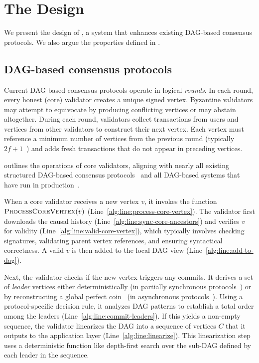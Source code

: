 \section{The \sysname Design} \label{sec:design}

We present the design of \sysname, a system that enhances existing DAG-based consensus protocols. We also argue the properties defined in .

\subsection{DAG-based consensus protocols} \label{sec:dag}

Current DAG-based consensus protocols operate in logical \emph{rounds}. In each round, every honest (core) validator creates a unique signed vertex. Byzantine validators may attempt to equivocate by producing conflicting vertices or may abstain altogether. During each round, validators collect transactions from users and vertices from other validators to construct their next vertex. Each vertex must reference a minimum number of vertices from the previous round (typically $2f + 1$~\cite{narwhal,bullshark,mysticeti}) and adds fresh transactions that do not appear in preceding vertices.

 outlines the operations of core validators, aligning with nearly all existing structured DAG-based consensus protocols~\cite{narwhal,bullshark,shoal,shoal++,mysticeti,dag-rider,dumbo-ng,dispersedledger,sailfish,bbca-chain,fino,gradeddag,cordial-miners,wahoo,lightdag,dai2024remora} and all DAG-based systems that have run in production~\cite{narwhal,bullshark,mysticeti,hammerhead}.

When a core validator receives a new vertex $v$, it invokes the function $\Call{ProcessCoreVertex}{v}$ (Line~\ref{alg:line:process-core-vertex}). The validator first downloads the causal history (Line~\ref{alg:line:sync-core-ancestors}) and verifies $v$ for validity (Line~\ref{alg:line:valid-core-vertex}), which typically involves checking signatures, validating parent vertex references, and ensuring syntactical correctness. A valid $v$ is then added to the local DAG view (Line~\ref{alg:line:add-to-dag}).

Next, the validator checks if the new vertex triggers any commits. It derives a set of \emph{leader} vertices either deterministically (in partially synchronous protocols~\cite{bullshark,shoal,mysticeti}) or by reconstructing a global perfect coin~\cite{abraham2023bingo} (in asynchronous protocols~\cite{narwhal,cordial-miners}). Using a protocol-specific decision rule, it analyzes DAG patterns to establish a total order among the leaders (Line~\ref{alg:line:commit-leaders}). If this yields a non-empty sequence, the validator linearizes the DAG into a sequence of vertices $C$ that it outputs to the application layer (Line~\ref{alg:line:linearize}). This linearization step uses a deterministic function like depth-first search over the sub-DAG defined by each leader in the sequence.

